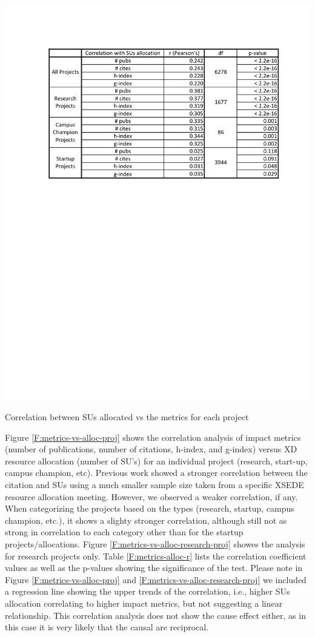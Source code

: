 \documentclass{sig-alternate}
\begin{document}
\begin{table}[htb] 
  \centering 
    \includegraphics[width=1.0\columnwidth]{images/metrics_alloc_r.pdf} 
  \caption{Correlation between SUs allocated vs the metrics for each project}\label{F:metrics-alloc-r} 
\end{table} 
 
Figure \ref{F:metrics-vs-alloc-proj} shows the correlation analysis of impact metrics (number of publications, number of citations, h-index, and g-index) versus XD resource allocation (number of SU’s) for an individual project (research, start-up, campus champion, etc).  Previous work showed a stronger correlation between the citation and SUs \cite{bollen2011and} using a much smaller sample size taken from a specific XSEDE resource allocation meeting. However, we observed a weaker correlation, if any. When categorizing the projects based on the types (research, startup, campus champion, etc.), it shows a slighty stronger correlation,  although still not as strong in correlation to each category other than for the startup projects/allocations. Figure \ref{F:metrics-vs-alloc-research-proj} showes the analysis for research projects only. Table \ref{F:metrics-alloc-r} lists the correlation coefficient values as well as the p-values showing the significance of the test. Please note in Figure \ref{F:metrics-vs-alloc-proj} and \ref{F:metrics-vs-alloc-research-proj} we included a regression line showing the upper trends of the correlation, i.e., higher SUs allocation correlating to higher impact metrics, but not suggesting a linear relationship. This correlation analysis does not show the cause effect either, as in this case it is very likely that the causal are reciprocal. 
 
\end{document}
